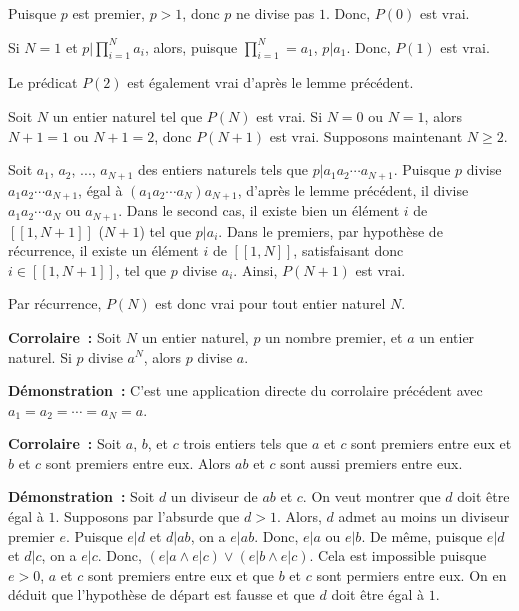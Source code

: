 Puisque $p$ est premier, $p > 1$, donc $p$ ne divise pas $1$. 
Donc, $P(0)$ est vrai.

Si $N = 1$ et $p \vert \prod_{i = 1}^N a_i$, alors, puisque $ \prod_{i = 1}^N= a_1$, $p \vert a_1$.
Donc, $P(1)$ est vrai.

Le prédicat $P(2)$ est également vrai d'après le lemme précédent. 

Soit $N$ un entier naturel tel que $P(N)$ est vrai. 
Si $N = 0$ ou $N = 1$, alors $N+1 = 1$ ou $N+1 = 2$, donc $P(N+1)$ est vrai.
Supposons maintenant $N \geq 2$.

Soit $a_1$, $a_2$, ..., $a_{N+1}$ des entiers naturels tels que $p \vert a_1 a_2 \cdots a_{N+1}$.
Puisque $p$ divise $a_1 a_2 \cdots a_{N+1}$, égal à $(a_1 a_2 \cdots a_N) a_{N+1}$, d'après le lemme précédent, il divise $a_1 a_2 \cdots a_N$ ou $a_{N+1}$. 
Dans le second cas, il existe bien un élément $i$ de $[\![1, N+1]\!]$ ($N+1$) tel que $p \vert a_i$. 
Dans le premiers, par hypothèse de récurrence, il existe un élément $i$ de $[\![1,N]\!]$, satisfaisant donc $i \in [\![1,N+1]\!]$, tel que $p$ divise $a_i$. 
Ainsi, $P(N+1)$ est vrai.

Par récurrence, $P(N)$ est donc vrai pour tout entier naturel $N$. 

\done

\medskip

\noindent\textbf{Corrolaire :} 
Soit $N$ un entier naturel, $p$ un nombre premier, et $a$ un entier naturel.
Si $p$ divise $a^N$, alors $p$ divise $a$.

\medskip

\noindent\textbf{Démonstration :} 
C'est une application directe du corrolaire précédent avec $a_1 = a_2 = \cdots = a_N = a$.

\done

\medskip

\noindent\textbf{Corrolaire :} Soit $a$, $b$, et $c$ trois entiers tels que $a$ et $c$ sont premiers entre eux et $b$ et $c$ sont premiers entre eux. Alors $ab$ et $c$ sont aussi premiers entre eux.

\medskip 

\noindent\textbf{Démonstration :} Soit $d$ un diviseur de $ab$ et $c$. 
On veut montrer que $d$ doit être égal à $1$. 
Supposons par l'absurde que $d > 1$. 
Alors, $d$ admet au moins un diviseur premier $e$.
Puisque $e \vert d$ et $d \vert ab$, on a $e \vert ab$.
Donc, $e \vert a$ ou $e \vert b$.
De même, puisque $e \vert d$ et $d \vert c$, on a $e \vert c$.
Donc, $(e \vert a \wedge e \vert c) \vee (e \vert b \wedge e \vert c)$.
Cela est impossible puisque $e > 0$, $a$ et $c$ sont premiers entre eux et que $b$ et $c$ sont permiers entre eux. 
On en déduit que l'hypothèse de départ est fausse et que $d$ doit être égal à $1$. 

